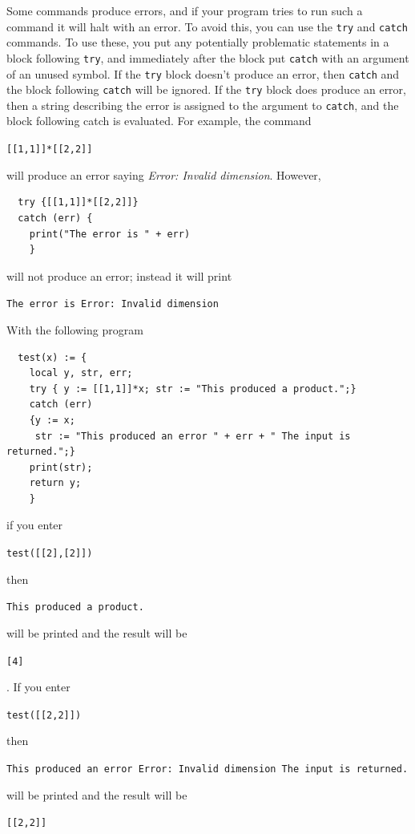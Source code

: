 \documentclass[a4paper,11pt]{book}
\begin{document}
Some commands produce errors, and if your program tries to run such a
command it will halt with an error.  To avoid this, you can use the
\texttt{try} and \texttt{catch} commands.  To
use these, you put any potentially problematic statements in a block
following \texttt{try}, and immediately after the block put
\texttt{catch} with an argument of an unused symbol.  If the
\texttt{try} block doesn't produce an error, then \texttt{catch} and
the block following \texttt{catch} will be ignored.  If the
\texttt{try} block does produce an error, then a string describing the
error is assigned to the argument to \texttt{catch}, and the block
following catch is evaluated.  For example, the command
\begin{center}
  {\tt [[1,1]]*[[2,2]]}
\end{center}
will produce an error saying \textit{Error: Invalid dimension}.  
However,
\begin{verbatim}
  try {[[1,1]]*[[2,2]]}
  catch (err) {
    print("The error is " + err)
    }
\end{verbatim}
will not produce an error; instead it will print
\begin{center}
  {\tt The error is Error: Invalid dimension}
\end{center}

With the following program
\begin{verbatim}
  test(x) := {
    local y, str, err;
    try { y := [[1,1]]*x; str := "This produced a product.";}
    catch (err)
    {y := x; 
     str := "This produced an error " + err + " The input is returned.";}
    print(str);
    return y;
    }
\end{verbatim}
if you enter
\begin{center}
  {\tt test([[2],[2]])}
\end{center}
then 
\begin{center}
  {\tt This produced a product.}
\end{center}
will be printed and the result will be
\begin{center}
  {\tt [4]}
\end{center}.
If you enter
\begin{center}
  {\tt test([[2,2]])}
\end{center}
then
\begin{center}
  {\tt This produced an error  Error: Invalid dimension The input is
  returned.}
\end{center}
will be printed and the result will be
\begin{center}
  {\tt [[2,2]]}
\end{center}
\end{document}
